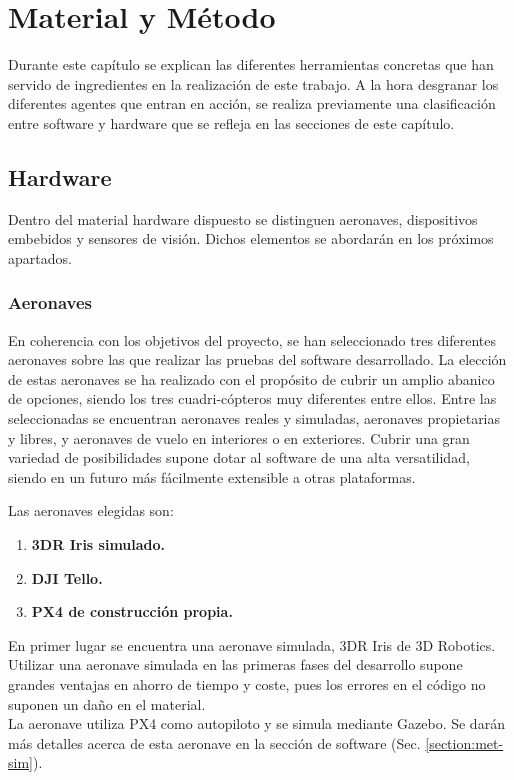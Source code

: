 \documentclass[../main.tex]{subfiles}
\begin{document}
\chapter{Material y Método} \label{cap:met}
Durante este capítulo se explican las diferentes herramientas concretas que han servido de ingredientes en la realización de este trabajo. A la hora desgranar los diferentes agentes que entran en acción, se realiza previamente una clasificación entre software y hardware que se refleja en las secciones de este capítulo.

\section{Hardware}  \label{section:met-hardware}
Dentro del material hardware dispuesto se distinguen aeronaves, dispositivos embebidos y sensores de visión. Dichos elementos se abordarán en los próximos apartados.

\subsection{Aeronaves} \label{section:met-aeronaves}
En coherencia con los objetivos del proyecto, se han seleccionado tres diferentes aeronaves sobre las que realizar las pruebas del software desarrollado. La elección de estas aeronaves se ha realizado con el propósito de cubrir un amplio abanico de opciones, siendo los tres cuadri-cópteros muy diferentes entre ellos. Entre las seleccionadas se encuentran aeronaves reales y simuladas, aeronaves propietarias y libres, y aeronaves de vuelo en interiores o en exteriores. Cubrir una gran variedad de posibilidades supone dotar al software de una alta versatilidad, siendo en un futuro más fácilmente extensible a otras plataformas.

Las aeronaves elegidas son:
\begin{enumerate}
    \item \textbf{3DR Iris simulado.}
    \item \textbf{DJI Tello.}
    \item \textbf{PX4 de construcción propia.}
\end{enumerate}

En primer lugar se encuentra una aeronave simulada, 3DR Iris de 3D Robotics. Utilizar una aeronave simulada en las primeras fases del desarrollo supone grandes ventajas en ahorro de tiempo y coste, pues los errores en el código no suponen un daño en el material. \\
La aeronave utiliza PX4 como autopiloto y se simula mediante Gazebo. Se darán más detalles acerca de esta aeronave en la sección de software (Sec. \ref{section:met-sim}).
\end{document}
